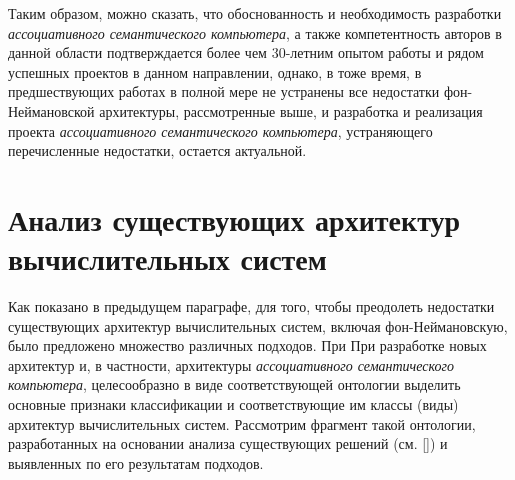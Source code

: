 Таким образом, можно сказать, что обоснованность и необходимость разработки \textit{ассоциативного семантического компьютера}, а также компетентность авторов в данной области подтверждается более чем 30-летним опытом работы и рядом успешных проектов в данном направлении, однако, в тоже время, в предшествующих работах в полной мере не устранены все недостатки фон-Неймановской архитектуры, рассмотренные выше, и разработка и реализация проекта \textit{ассоциативного семантического компьютера}, устраняющего перечисленные недостатки, остается актуальной.

\section{Анализ существующих архитектур вычислительных систем}
Как показано в предыдущем параграфе, для того, чтобы преодолеть недостатки существующих архитектур вычислительных систем, включая фон-Неймановскую, было предложено множество различных подходов. При При разработке новых архитектур и, в частности, архитектуры \textit{ассоциативного семантического компьютера}, целесообразно в виде соответствующей онтологии выделить основные признаки классификации и соответствующие им классы (виды) архитектур вычислительных систем. Рассмотрим фрагмент такой онтологии, разработанных на основании анализа существующих решений (см. []) и выявленных по его результатам подходов.

